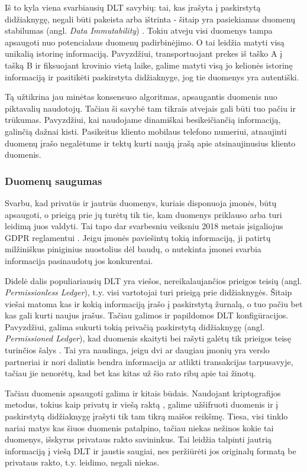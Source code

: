 Iš to kyla viena svarbiausių DLT savybių: tai, kas įrašyta į paskirstytą didžiaknygę, negali būti pakeista arba ištrinta - šitaip yra pasiekiamas duomenų stabilumas (angl. \textit{Data Immutability}) \cite{xu2017dl}. Tokiu atveju visi duomenys tampa apsaugoti nuo potencialaus duomenų padirbinėjimo. O tai leidžia matyti visą unikalią istorinę informaciją. Pavyzdžiui, transportuojant prekes iš taško A į tašką B ir fiksuojant krovinio vietą laike, galime matyti visą jo kelionės istorinę informaciją ir pasitikėti paskirstyta didžiaknyge, jog tie duomenys yra autentiški. 

Tą užtikrina jau minėtas konsensuso algoritmas, apsaugantis duomenis nuo piktavalių naudotojų. Tačiau ši savybė tam tikrais atvejais gali būti tuo pačiu ir trūkumas. Pavyzdžiui, kai naudojame dinamiškai besikeičiančią informaciją, galinčią dažnai kisti. Pasikeitus kliento mobilaus telefono numeriui, atnaujinti duomenų įrašo negalėtume ir tektų kurti naują įrašą apie atsinaujinusius kliento duomenis.

\subsubsection{Duomenų saugumas}

Svarbu, kad privatūs ir jautrūs duomenys, kuriais disponuoja įmonės, būtų apsaugoti, o prieigą prie jų turėtų tik tie, kam duomenys priklauso arba turi leidimą juos valdyti. Tai tapo dar svarbesniu veiksniu 2018 metais įsigaliojus GDPR reglamentui \cite{ferrari2018eu}. Jeigu įmonės paviešintų tokią informaciją, ji patirtų milžiniškus piniginius nuostolius dėl baudų, o nutekinta įmonei svarbia informacija pasinaudotų jos konkurentai.

Didelė dalis populiariausių DLT yra viešos, nereikalaujančios prieigos teisių (angl. \textit{Permissionless Ledger}), t.y. visi vartotojai turi prieigą prie didžiaknygės. Šitaip viešai matoma kas ir kokią informaciją įrašo į paskirstytą žurnalą, o tuo pačiu bet kas gali kurti naujus įrašus. Tačiau galimos ir papildomos DLT konfigūracijos. Pavyzdžiui, galima sukurti tokią privačią paskirstytą didžiaknygę (angl. \textit{Permissioned Ledger}), kad duomenis skaityti bei rašyti galėtų tik prieigos teisę turinčios šalys \cite{backlund2016technical}. Tai yra naudinga, jeigu dvi ar daugiau įmonių yra verslo partneriai ir nori dalintis bendra informacija ar atlikti transakcijas tarpusavyje, tačiau jie nenorėtų, kad bet kas kitas už šio rato ribų apie tai žinotų. 

Tačiau duomenis apsaugoti galima ir kitais būdais. Naudojant kriptografijos metodus, tokius kaip privatų ir viešą raktą \cite{zyskind2015decentralizing}, galime užšifruoti duomenis ir į paskirstytą didžiaknygę įrašyti tik tam tikrą maišos reikšmę. Tiesa, visi tinklo nariai matys kas šiuos duomenis patalpino, tačiau niekas nežinos kokie tai duomenys, išskyrus privataus rakto savininkus. Tai leidžia talpinti jautrią informaciją į viešą DLT ir jaustis saugiai, nes peržiūrėti jos originalų formatą be privataus rakto, t.y. leidimo, negali niekas.





